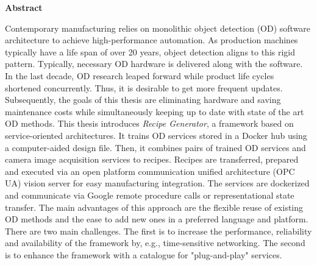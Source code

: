 \thispagestyle{empty}
\vspace*{1.0cm}

\begin{center}
    \textbf{Abstract}
\end{center}

\vspace*{0.5cm}

\noindent
Contemporary manufacturing relies on monolithic object detection (OD) software architecture to achieve high-performance automation. As production machines typically have a life span of over 20 years, object detection aligns to this rigid pattern. Typically, necessary OD hardware is delivered along with the software. In the last decade, OD research leaped forward while product life cycles shortened concurrently. Thus, it is desirable to get more frequent updates. Subsequently, the goals of this thesis are eliminating hardware and saving maintenance costs while simultaneously keeping up to date with state of the art OD methods. This thesis introduces \textit{Recipe Generator}, a framework based on service-oriented architectures. It trains OD services stored in a Docker hub using a computer-aided design file. Then, it combines pairs of trained OD services and camera image acquisition services to recipes. Recipes are transferred, prepared and executed via an open platform communication unified architecture (OPC UA) vision server for easy manufacturing integration. The services are dockerized and communicate via Google remote procedure calls or representational state transfer. The main advantages of this approach are the flexible reuse of existing OD methods and the ease to add new ones in a preferred language and platform. There are two main challenges. The first is to increase the performance, reliability and availability of the framework by, e.g., time-sensitive networking. The second is to enhance the framework with a catalogue for "plug-and-play" services.
